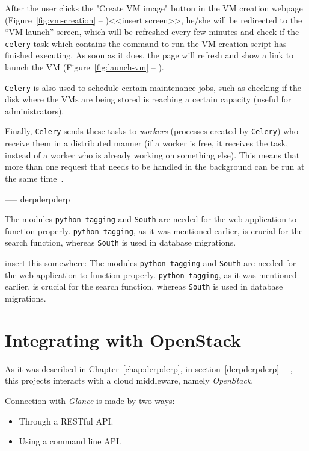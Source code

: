 After the user clicks the "Create VM image" button in the VM creation webpage (Figure~\ref{fig:vm-creation} -- )<<insert screen>>, he/she will be redirected to the ``VM launch'' screen, which will be refreshed every few minutes and check if the \texttt{celery} task which contains the command to run the VM creation script has finished executing. As soon as it does, the page will refresh and show a link to launch the VM (Figure~\ref{fig:launch-vm} -- ).

\texttt{Celery} is also used to schedule certain maintenance jobs, such as checking if the disk where the VMs are being stored is reaching a certain capacity (useful for administrators).

Finally, \texttt{Celery} sends these tasks to \textit{workers} (processes created by \texttt{Celery}) who receive them in a distributed manner (if a worker is free, it receives the task, instead of a worker who is already working on something else). This means that more than one request that needs to be handled in the background can be run at the same time~\cite{http://celeryproject.org/}.




----- derpderpderp

The modules \texttt{python-tagging} and \texttt{South} are needed for the web application to function properly. \texttt{python-tagging}, as it was mentioned earlier, is crucial for the search function, whereas \texttt{South} is used in database migrations.


\pagebreak

insert this somewhere:
The modules \texttt{python-tagging} and \texttt{South} are needed for the web application to function properly. \texttt{python-tagging}, as it was mentioned earlier, is crucial for the search function, whereas \texttt{South} is used in database migrations.

\section{Integrating with OpenStack}

As it was described in Chapter~\ref{chap:derpderp}, in section~\ref{derpderpderp} --~, this projects interacts with a cloud middleware, namely \textit{OpenStack}.

Connection with \textit{Glance} is made by two ways:

\begin{itemize}
\item Through a RESTful API.
\item Using a command line API.
\end{itemize} 

